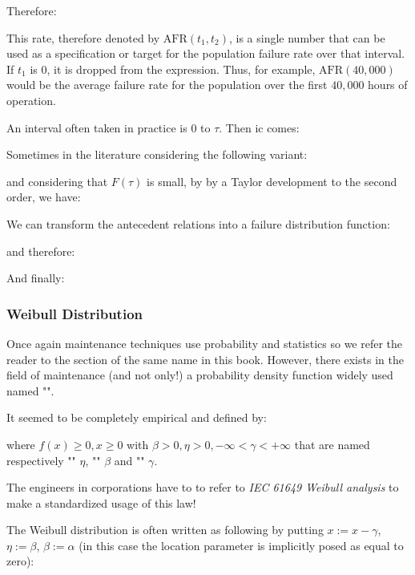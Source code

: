 	Therefore:
	
	This rate, therefore denoted by $\text{AFR}(t_1,t_2)$, is a single number that can be used as a specification or target for the population failure rate over that interval. If $t_1$ is $0$, it is dropped from the expression. Thus, for example, $\text{AFR}(40,000)$ would be the average failure rate for the population over the first $40,000$ hours of operation.  

	An interval often taken in practice is $0$ to $\tau$. Then ic comes:
	
 	Sometimes in the literature considering the following variant:
	
	and considering that $F(\tau)$ is small, by by a Taylor development to the second order, we have:
	
 	We can transform the antecedent relations into a failure distribution function:
	
 	and therefore:
	
 	And finally:	
	
	
	\pagebreak
	\subsubsection{Weibull Distribution}
	Once again maintenance techniques use probability and statistics so we refer the reader to the section of the same name in this book. However, there exists in the field of maintenance (and not only!) a probability density function widely used named "".
	
	It seemed to be completely empirical and defined by:
	
	where $f(x)\geq 0,x\geq 0$ with $\beta >0,\eta>0,-\infty<\gamma<+\infty$ that are named respectively "" $\eta$, "" $\beta$ and ""  $\gamma$.
	
	\begin{tcolorbox}[title=Remark,colframe=black,arc=10pt]
	The engineers in corporations have to to refer to \textit{IEC 61649 Weibull analysis} to make a standardized usage of this law!
	\end{tcolorbox}	
	The Weibull distribution is often written as following by putting $x:=x-\gamma$, $\eta:=\beta$, $\beta:=\alpha$ (in this case the location parameter is implicitly posed as equal to zero):
	
